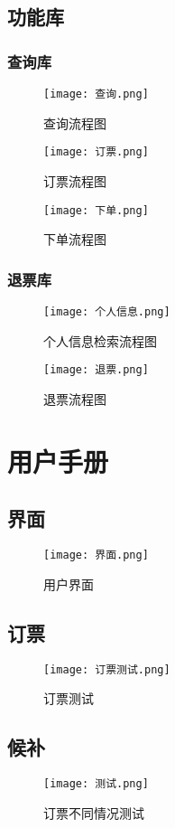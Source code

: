 \documentclass{DateStructure}
\begin{document}
\subsection{功能库}
\subsubsection{查询库}
\begin{figure}[H] 
\centering
\texttt{[image: 查询.png]}
\caption{查询流程图}	
\end{figure}
\begin{figure}[H] 
\centering
\texttt{[image: 订票.png]}
\caption{订票流程图}	
\end{figure}
\begin{figure}[H] 
\centering
\texttt{[image: 下单.png]}
\caption{下单流程图}	
\end{figure}

\subsubsection{退票库}
\begin{figure}[H] 
\centering
\texttt{[image: 个人信息.png]}
\caption{个人信息检索流程图}	
\end{figure}
\begin{figure}[H] 
\centering
\texttt{[image: 退票.png]}
\caption{退票流程图}	
\end{figure}

\section{用户手册}
\subsection{界面}
\begin{figure}[H] 
\centering
\texttt{[image: 界面.png]}
\caption{用户界面}
\end{figure}
\subsection{订票}
\begin{figure}[H] 
\centering
\texttt{[image: 订票测试.png]}
\caption{订票测试}	
\end{figure}
\subsection{候补}
\begin{figure}[H] 
\centering
\texttt{[image: 测试.png]}
\caption{订票不同情况测试}	
\end{figure}
\end{document}
